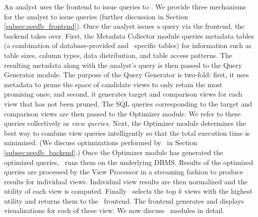 An analyst uses the frontend to issue queries to \SeeDB. We provide three
mechanisms for the analyst to issue queries (further discussion in
Section \ref{subsec:seedb_frontend}).
Once the analyst issues a query via the frontend, the backend takes over.
First, the Metadata Collector module queries metadata tables (a combination of
database-provided and \SeeDB\ specific tables) for information such as table
sizes, column types, data distribution, and table access patterns.
The resulting metadata along with the analyst's query is then passed to the
Query Generator module. The purpose of the Query Generator is two-fold:
first, it uses metadata to prune the space of candidate views to only retain the
most promising ones; and second, it generates target and comparison views for
each view that has not been pruned.
The SQL queries corresponding to the target and comparison views are then passed
to the Optimizer module. We refer to these queries collectively as {\it view
queries}.
Next, the Optimizer module determines the best way to
combine view queries intelligently so that the total execution time is
minimized.
(We discuss optimizations performed by \SeeDB\ in Section
\ref{subsec:seedb_backend}.) Once the Optimizer module has generated the
optimized queries, \SeeDB\ runs them on the underlying DBMS.
Results of the optimized queries are processed by the View Processor in a
streaming fashion to produce results for individual views. Individual view
results are then normalized and the utility of each view is computed.
Finally \SeeDB\ selects the top $k$ views with the highest utility and returns
them to the \SeeDB\ frontend. The frontend generates 
and displays visualizations for each of these view. We now discuss
\SeeDB\ modules in detail.